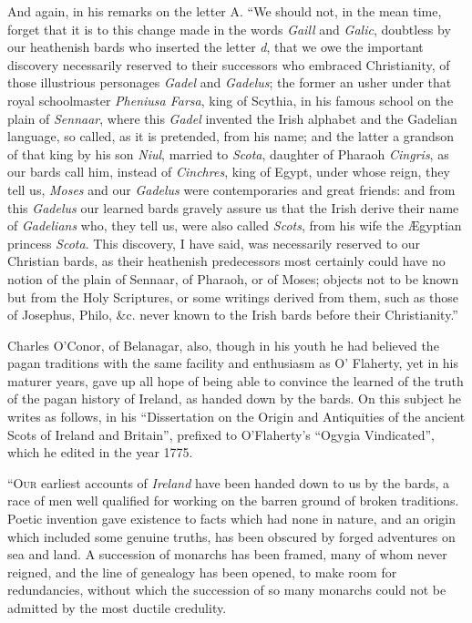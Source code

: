 \documentclass[11pt,oneside]{memoir}
\begin{document}
And again, in his remarks on the letter A. 
``We should not, in the mean time, forget that it is to this change made in the words \textit{Gaill} and \textit{Galic}, doubtless by our heathenish bards who inserted the letter \textit{d}, that we owe the important discovery necessarily reserved to their successors who embraced Christianity, of those illustrious personages \textit{Gadel} and \textit{Gadelus}; the former an usher under that royal schoolmaster \textit{Pheniusa Farsa}, king of Scythia, in his famous school on the plain of \textit{Sennaar}, where this \textit{Gadel} invented the Irish alphabet and the Gadelian language, so called, as it is pretended, from his name; and the latter a grandson of that king by his son \textit{Niul}, married to \textit{Scota}, daughter of Pharaoh \textit{Cingris}, as our bards call him, instead of \textit{Cinchres}, king of Egypt, under whose reign, they tell us, \textit{Moses} and our \textit{Gadelus} were contemporaries and great friends: and from this \textit{Gadelus} our learned bards gravely assure us that the Irish derive their name of \textit{Gadelians} who, they tell us, were also called \textit{Scots}, from his wife the {\AE}gyptian princess \textit{Scota}.
This discovery, I have said, was necessarily reserved to our Christian bards, as their heathenish predecessors most certainly could have no notion of the plain of Sennaar, of Pharaoh, or of Moses; objects not to be known but from the Holy Scriptures, or some writings derived from them, such as those of Josephus, Philo, \&c. never known to the Irish bards before their Christianity.''

Charles O'Conor, of Belanagar, also, though in his youth he had believed the pagan traditions with the same facility and enthusiasm as O' Flaherty, yet in his maturer years, gave up all hope of being able to convince the learned of the truth of the pagan history of Ireland, as handed down by the bards.
On this subject he writes as follows, in his ``Dissertation on the Origin and Antiquities of the ancient Scots of Ireland and Britain'', prefixed to O'Flaherty's ``Ogygia Vindicated'', which he edited in the year 1775. 

``\textsc{Our} earliest accounts of \textit{Ireland} have been handed down to us by the bards, a race of men well qualified for working on the barren ground of broken traditions.
Poetic invention gave existence to facts which had none in nature, and an origin which included some genuine truths, has been obscured by forged adventures on sea and land.
A succession of monarchs has been framed, many of whom never reigned, and the line of genealogy has been opened, to make room for redundancies, without which the succession of so many monarchs could not be admitted by the most ductile credulity. 
\end{document}
